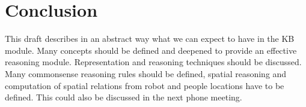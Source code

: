\documentclass{article}
\begin{document}
  \section{Conclusion}
  
  This draft describes in an abstract way what we can expect to have in the KB module. Many concepts should be defined and deepened to provide an effective reasoning module. Representation and reasoning techniques should be discussed. Many commonsense reasoning rules should be defined, spatial reasoning and computation of spatial relations from robot and people locations have to be defined. This could also be discussed in the next phone meeting.
     
\end{document}
